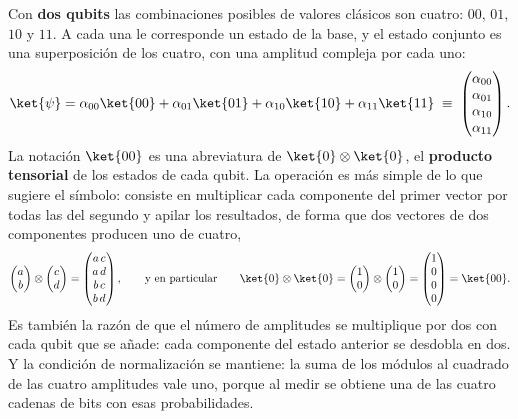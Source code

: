 Con \textbf{dos qubits} las combinaciones posibles de valores clásicos son cuatro: $00$, $01$,
$10$ y $11$. A cada una le corresponde un estado de la base, y el estado conjunto es una
superposición de los cuatro, con una amplitud compleja por cada uno:
\begin{equation}
\label{eq:dos_qubits}
\ket{\psi} = \alpha_{00}\ket{00} + \alpha_{01}\ket{01}
           + \alpha_{10}\ket{10} + \alpha_{11}\ket{11}
\;\equiv\;
\begin{pmatrix} \alpha_{00} \\ \alpha_{01} \\ \alpha_{10} \\ \alpha_{11}\end{pmatrix}.
\end{equation}
La notación $\ket{00}$ es una abreviatura de $\ket{0}\otimes\ket{0}$, el
\textbf{producto tensorial} de los estados de cada qubit. La operación es más simple de lo
que sugiere el símbolo: consiste en multiplicar cada componente del primer vector por todas
las del segundo y apilar los resultados, de forma que dos vectores de dos componentes
producen uno de cuatro,
\begin{equation}
\label{eq:tensorial}
\begin{pmatrix} a \\ b \end{pmatrix} \otimes \begin{pmatrix} c \\ d \end{pmatrix}
=
\begin{pmatrix} a\,c \\ a\,d \\ b\,c \\ b\,d \end{pmatrix},
\qquad\text{y en particular}\qquad
\ket{0}\otimes\ket{0} =
\begin{pmatrix} 1 \\ 0 \end{pmatrix} \otimes \begin{pmatrix} 1 \\ 0 \end{pmatrix}
=
\begin{pmatrix} 1 \\ 0 \\ 0 \\ 0 \end{pmatrix} = \ket{00}.
\end{equation}
Es también la razón de que el número de amplitudes se multiplique por dos con cada qubit
que se añade: cada componente del estado anterior se desdobla en dos. Y la condición de
normalización se mantiene: la suma de los
módulos al cuadrado de las cuatro amplitudes vale uno, porque al medir se obtiene una de
las cuatro cadenas de bits con esas probabilidades.

